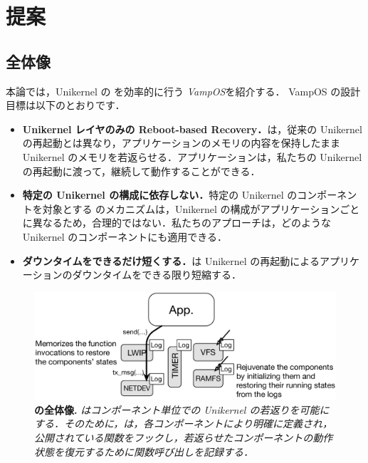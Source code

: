 \section{提案} \label{section:proposal}

\subsection{全体像}

本論では，Unikernel の \rr を効率的に行う \emph{VampOS}を紹介する．
VampOS の設計目標は以下のとおりです．

\begin{itemize}
    \item \textbf{Unikernel レイヤのみの Reboot-based Recovery．}{\sysname は，従来の Unikernel の再起動とは異なり，アプリケーションのメモリの内容を保持したまま Unikernel のメモリを若返らせる．アプリケーションは，私たちの Unikernel の再起動に渡って，継続して動作することができる．}
    \item \textbf{特定の Unikernel の構成に依存しない．}{特定の Unikernel のコンポーネントを対象とする \rr のメカニズムは，Unikernel の構成がアプリケーションごとに異なるため，合理的ではない．私たちのアプローチは，どのような Unikernel のコンポーネントにも適用できる．}
    \item \textbf{ダウンタイムをできるだけ短くする．}{\sysname は Unikernel の再起動によるアプリケーションのダウンタイムをできる限り短縮する．}
\end{itemize}

\begin{figure}[t]
    \begin{center}
      \includegraphics[scale=0.3]{./img/vampos.eps}
      \caption{\textbf{{\sysname} の全体像.} \textit{{\sysname} はコンポーネント単位での Unikernel の若返りを可能にする．そのために，\sysname は，各コンポーネントにより明確に定義され，公開されている関数をフックし，若返らせたコンポーネントの動作状態を復元するために関数呼び出しを記録する．}}
      \label{fig:overview}
    \end{center}
\end{figure}

